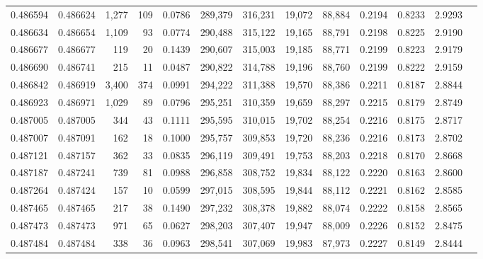 \begin{tabular}{rrrrrrrrrrrrr}
0.486594 & 0.486624 & 1,277 &   109 &                                     0.0786 & 289,379 & 316,231 &  19,072 &  88,884 & 0.2194 & 0.8233 & 2.9293 \\
0.486634 & 0.486654 & 1,109 &    93 &                                     0.0774 & 290,488 & 315,122 &  19,165 &  88,791 & 0.2198 & 0.8225 & 2.9190 \\
0.486677 & 0.486677 &   119 &    20 &                                     0.1439 & 290,607 & 315,003 &  19,185 &  88,771 & 0.2199 & 0.8223 & 2.9179 \\
0.486690 & 0.486741 &   215 &    11 &                                     0.0487 & 290,822 & 314,788 &  19,196 &  88,760 & 0.2199 & 0.8222 & 2.9159 \\
0.486842 & 0.486919 & 3,400 &   374 &                                     0.0991 & 294,222 & 311,388 &  19,570 &  88,386 & 0.2211 & 0.8187 & 2.8844 \\
0.486923 & 0.486971 & 1,029 &    89 &                                     0.0796 & 295,251 & 310,359 &  19,659 &  88,297 & 0.2215 & 0.8179 & 2.8749 \\
0.487005 & 0.487005 &   344 &    43 &                                     0.1111 & 295,595 & 310,015 &  19,702 &  88,254 & 0.2216 & 0.8175 & 2.8717 \\
0.487007 & 0.487091 &   162 &    18 &                                     0.1000 & 295,757 & 309,853 &  19,720 &  88,236 & 0.2216 & 0.8173 & 2.8702 \\
0.487121 & 0.487157 &   362 &    33 &                                     0.0835 & 296,119 & 309,491 &  19,753 &  88,203 & 0.2218 & 0.8170 & 2.8668 \\
0.487187 & 0.487241 &   739 &    81 &                                     0.0988 & 296,858 & 308,752 &  19,834 &  88,122 & 0.2220 & 0.8163 & 2.8600 \\
0.487264 & 0.487424 &   157 &    10 &                                     0.0599 & 297,015 & 308,595 &  19,844 &  88,112 & 0.2221 & 0.8162 & 2.8585 \\
0.487465 & 0.487465 &   217 &    38 &                                     0.1490 & 297,232 & 308,378 &  19,882 &  88,074 & 0.2222 & 0.8158 & 2.8565 \\
0.487473 & 0.487473 &   971 &    65 &                                     0.0627 & 298,203 & 307,407 &  19,947 &  88,009 & 0.2226 & 0.8152 & 2.8475 \\
0.487484 & 0.487484 &   338 &    36 &                                     0.0963 & 298,541 & 307,069 &  19,983 &  87,973 & 0.2227 & 0.8149 & 2.8444 \\

\end{tabular}
